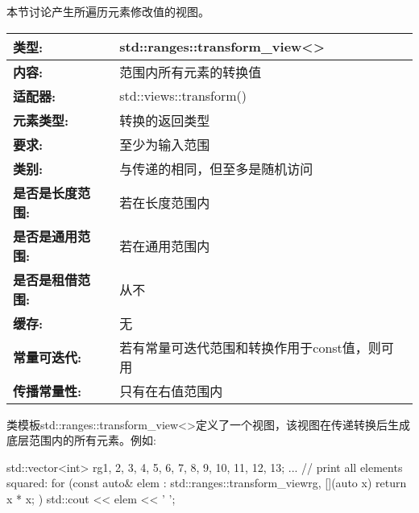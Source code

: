 

本节讨论产生所遍历元素修改值的视图。


\begin{longtable}[c]{|l|l|}
\hline
\textbf{类型:}                 & std::ranges::transform\_view\textless{}\textgreater{} \\ \hline
\endfirsthead
%
\endhead
%
\textbf{内容:}              & 范围内所有元素的转换值      \\ \hline
\textbf{适配器:}              & std::views::transform()                               \\ \hline
\textbf{元素类型:}         & 转换的返回类型               \\ \hline
\textbf{要求:}             & 至少为输入范围                                  \\ \hline
\textbf{类别:}             & 与传递的相同，但至多是随机访问              \\ \hline
\textbf{是否是长度范围:}       & 若在长度范围内                                     \\ \hline
\textbf{是否是通用范围:}      & 若在通用范围内                                    \\ \hline
\textbf{是否是租借范围:}    & 从不                                                 \\ \hline
\textbf{缓存:}               & 无                                               \\ \hline
\textbf{常量可迭代:} & 若有常量可迭代范围和转换作用于const值，则可用 \\ \hline
\textbf{传播常量性:} & 只有在右值范围内                               \\ \hline
\end{longtable}

类模板std::ranges::transform\_view<>定义了一个视图，该视图在传递转换后生成底层范围内的所有元素。例如:

\begin{cpp}
std::vector<int> rg{1, 2, 3, 4, 5, 6, 7, 8, 9, 10, 11, 12, 13};
...
// print all elements squared:
for (const auto& elem : std::ranges::transform_view{rg, [](auto x) {
							return x * x;
					}}) {
	std::cout << elem << ' ';
}
\end{cpp}

